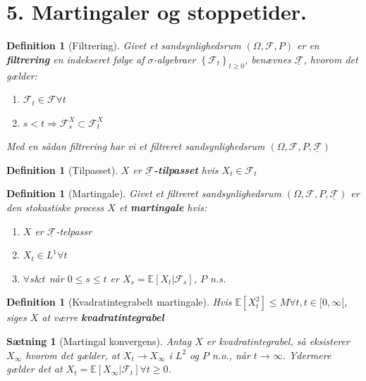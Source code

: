 \documentclass[12pt]{report}
\newtheorem{theorem}[lemma]{Sætning}
\newtheorem{definition}[lemma]{Definition}
\theoremstyle{break}
\theoremstyle{break}
\newcommand{\EE}{\mathbb{E}}
\newcommand{\FI}{\mathcal{F}}
\newcommand{\FIU}{\underline{\mathcal{F}}}
\newcommand{\1}{\mathds{1}}
\begin{document}
\section*{5. Martingaler og stoppetider.}
\begin{definition}[Filtrering]
	Givet et sandsynlighedsrum $(\Omega, \FI, P)$ er en \textbf{filtrering} en indekseret følge af $\sigma$-algebraer $\left\{ \FI_t \right\}_{t\geq 0}$,  benævnes $\FIU$, hvorom det gælder:
	\begin{enumerate}
		\item $\FI_t \in \FI \forall t$
		\item $s<t \Rightarrow \FI_s^X\subset \FI_t^X$
	\end{enumerate}
	Med en sådan filtrering har vi et filtreret sandsynlighedsrum $(\Omega, \FI, P,\FIU)$
\end{definition}

\begin{definition}[Tilpasset]
	$X$ er \textbf{$\FIU$-tilpasset} hvis $X_t\in\FI_t$
\end{definition}

\begin{definition}[Martingale]
	Givet et filtreret sandsynlighedsrum $(\Omega, \FI, P,\FIU)$ er den stokastiske process $X$ et \textbf{martingale} hvis:
	\begin{enumerate}
		\item $X$ er $\FIU$-telpassr
		\item $X_t\in L^1 \forall t$
		\item $\forall s \& t$ når $0\leq s \leq t$ er $X_s=\EE[X_t\vert \FI_s]$, $P$ n.s.
	\end{enumerate}
\end{definition}

\begin{definition}[Kvadratintegrabelt martingale]
	Hvis $\EE \left[ X_t^2 \right]\leq M \forall t,t\in[ 0,\infty [$, siges $X$ at værre \textbf{kvadratintegrabel}
\end{definition}
\begin{theorem}[Martingal konvergens]
	Antag $X$ er kvadratintegrabel, så eksisterer $X_\infty$ hvorom det gælder, at $X_t\to X_\infty$ i $L^2$ og $P$ n.o., når $t\to \infty$.
	Ydermere gælder det at $X_t=\EE[ X_\infty\vert\FI_t ]\forall t\geq 0$.
\end{theorem}
\end{document}
